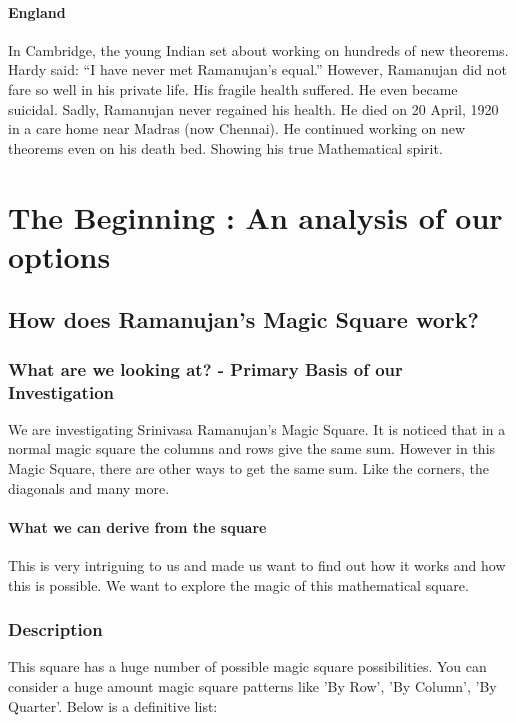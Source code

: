 \documentclass[a4paper,12pt,oneside]{book}
\begin{document}
\subsection{England}
In Cambridge, the young Indian set about working on hundreds of new theorems. Hardy said: “I have never met Ramanujan’s equal.”\cite{studyMagicSquare} However, Ramanujan did not fare so well in his private life. His fragile health suffered. He even became suicidal.
Sadly, Ramanujan never regained his health. He died on 20 April, 1920 in a care home near Madras (now Chennai). He continued working on new theorems even on his death bed. Showing his true Mathematical spirit.\cite{historyRamanujan}

\part{The Beginning : An analysis of our options}

\chapter{How does Ramanujan's Magic Square work?}

\section{What are we looking at? - Primary Basis of our Investigation}
\tab We are investigating Srinivasa Ramanujan's Magic Square. It is noticed that in a normal magic square the columns and rows give the same sum. However in this Magic Square, there are other ways to get the same sum. Like the corners, the diagonals and many more.

\subsection{What we can derive from the square}
\tab This is very intriguing to us and made us want to find out how it works and how this is possible. We want to explore the magic of this mathematical square.

\newpage
\section{Description}
\tab This square has a huge number of possible magic square possibilities. You can consider a huge amount magic square patterns like 'By Row', 'By Column', 'By Quarter'.  Below is a definitive list:
\end{document}
